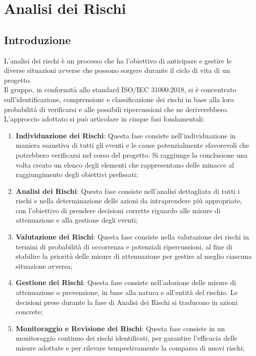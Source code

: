\documentclass[10pt]{article}
\begin{document}
\newpage
\section{Analisi dei Rischi}
\label{analisi-rischi}
    \subsection{Introduzione}
    \label{introduzione-analisi}
    L'analisi dei rischi è un processo che ha l'obiettivo di anticipare e gestire le diverse situazioni avverse che possono sorgere durante il ciclo di vita di un progetto.\\
    Il gruppo, in conformità allo standard ISO/IEC 31000:2018, si è concentrato sull'identificazione, comprensione e classificazione dei rischi in base alla loro probabilità di verificarsi e alle possibili ripercussioni che ne deriverebbero.\\ 
    L'approccio adottato si può articolare in cinque fasi fondamentali:
    \begin{enumerate}
        \item \textbf{Individuazione dei Rischi}:
        Questa fase consiste nell'individuazione in maniera esaustiva di tutti gli eventi e le cause potenzialmente sfavorevoli che potrebbero verificarsi nel corso del progetto. Si raggiunge la conclusione una volta creato un elenco degli elementi che rappresentano delle minacce al raggiungimento degli obiettivi prefissati;
        \item \textbf{Analisi dei Rischi}:
        Questa fase consiste nell'analisi dettagliata di tutti i rischi e nella determinazione delle azioni da intraprendere più appropriate, con l'obiettivo di prendere decisioni corrette riguardo alle misure di attenuazione e alla gestione degli eventi;
        \item \textbf{Valutazione dei Rischi}:
        Questa fase consiste nella valutazione dei rischi in termini di probabilità di occorrenza e potenziali ripercussioni, al fine di stabilire la priorità delle misure di attenuazione per gestire al meglio ciascuna situazione avversa;
        \item \textbf{Gestione dei Rischi}:
        Questa fase consiste nell'adozione delle misure di attenuazione o prevenzione, in base alla natura e all'entità del rischio. Le decisioni prese durante la fase di Analisi dei Rischi si traducono in azioni concrete;
        \item \textbf{Monitoraggio e Revisione dei Rischi}:
        Questa fase consiste in un monitoraggio continuo dei rischi identificati, per garantire l'efficacia delle misure adottate e per rilevare tempestivamente la comparsa di nuovi rischi;
    \end{enumerate}
\end{document}
